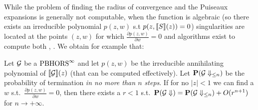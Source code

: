 \documentclass{easychair}
\begin{document}
   
 While the problem of finding the radius of convergence and the Puiseaux expansions is generally not computable, when the function is algebraic (so there exists an irreducible polynomial $p(z,w)$ s.t $p(z,\llbracket S\rrbracket(z))=0$) singularities are located at the points $(z,w)$ for which $\frac{\partial p(z,w)}{\partial w} = 0$ and algorithms exist to compute both \cite{DBLP:books/daglib/0023751}, \cite{CHUDNOVSKY1986271}. We obtain for example that:
 \begin{prop}
 Let $\mathcal{G}$ be a $\text{PBHORS}^{\infty}$ and 
   let $p(z,w)$ be the irreducible annihilating polynomial of $\llbracket\mathcal{G}\rrbracket(z)$ (that can be computed effectively). Let $\mathbf{P}(\mathcal{G}\Downarrow_{\leq n} )$ be the probability of termination \emph{in no more than $n$ steps}. If for no $|z|<1$ we can find a $w$ s.t.~$ \frac{\partial p(z,w)}{\partial w} = 0$, then there exists a $r < 1$ s.t.~$\mathbf{P}(\mathcal{G}\Downarrow) = \mathbf{P}(\mathcal{G}\Downarrow_{\leq n}) + O(r^{n+1})$ for $n \to + \infty$.  
 \end{prop}
\end{document}
